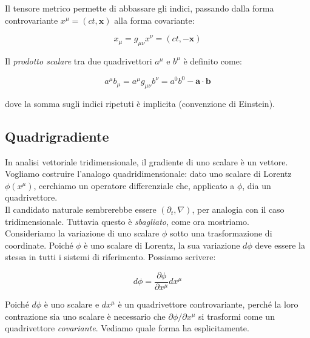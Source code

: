 Il tensore metrico permette di abbassare gli indici, passando dalla forma controvariante $x^\mu = (ct, \mathbf{x})$ alla forma 
covariante:

\begin{equation}
    x_\mu = g_{\mu\nu} x^\nu = (ct, -\mathbf{x})
\end{equation}

Il \emph{prodotto scalare} tra due quadrivettori $a^\mu$ e $b^\mu$ è definito come: 

\begin{tcolorbox}[colback=yellow!10!white, colframe=orange!70!black, boxrule=0.8pt]
\begin{equation}
    a^\mu b_\mu = a^\mu g_{\mu\nu} b^\nu = 
    a^0 b^0 - \mathbf{a}\cdot\mathbf{b}
\end{equation}
\end{tcolorbox}

dove la somma sugli indici ripetuti è implicita (convenzione di Einstein). 

\subsection{Quadrigradiente}

In analisi vettoriale tridimensionale, il gradiente di uno scalare è un vettore. Vogliamo costruire l'analogo quadridimensionale: dato uno scalare di Lorentz $\phi(x^\mu)$, cerchiamo un operatore differenziale che, applicato a $\phi$, dia un quadrivettore.\\

Il candidato naturale sembrerebbe essere $(\partial_t, \nabla)$, per analogia con il caso tridimensionale. Tuttavia questo è \emph{sbagliato}, come ora mostriamo.\\

Consideriamo la variazione di uno scalare $\phi$ sotto una trasformazione di coordinate. Poiché $\phi$ è uno scalare di Lorentz, la sua variazione $d\phi$ deve essere la stessa in tutti i sistemi di riferimento. Possiamo scrivere:

\begin{equation}
    d\phi = \frac{\partial\phi}{\partial x^\mu}dx^\mu
\end{equation}

Poiché $d\phi$ è uno scalare e $dx^\mu$ è un quadrivettore controvariante, perché la loro contrazione sia uno scalare è necessario che $\partial\phi/\partial x^\mu$ si trasformi come un quadrivettore \emph{covariante}. 
Vediamo quale forma ha esplicitamente.\\

